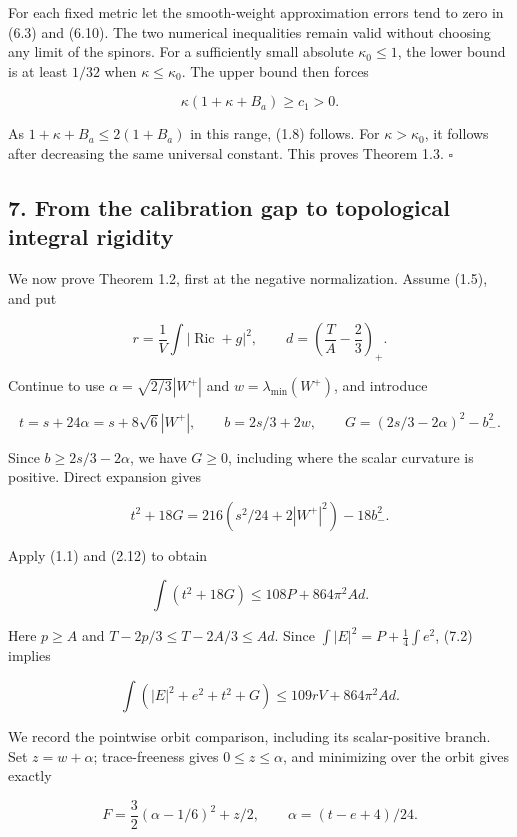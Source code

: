 \documentclass[
  10pt,
]{article}
\begin{document}
For each fixed metric let the smooth-weight approximation errors tend to
zero in (6.3) and (6.10). The two numerical inequalities remain valid
without choosing any limit of the spinors. For a sufficiently small
absolute \(\kappa_0\le1\), the lower bound is at least \(1/32\) when
\(\kappa\le\kappa_0\). The upper bound then forces

\[
                         \kappa(1+\kappa+B_a)\ge c_1>0.
\]

As \(1+\kappa+B_a\le2(1+B_a)\) in this range, (1.8) follows. For
\(\kappa>\kappa_0\), it follows after decreasing the same universal
constant. This proves Theorem 1.3. \(\square\)

\hypertarget{from-the-calibration-gap-to-topological-integral-rigidity}{%
\subsection{7. From the calibration gap to topological integral
rigidity}\label{from-the-calibration-gap-to-topological-integral-rigidity}}

We now prove Theorem 1.2, first at the negative normalization. Assume
(1.5), and put

\[
 r=\frac1V\int|\operatorname{Ric}+g|^2,\qquad
 d=\left(\frac TA-\frac23\right)_+.
\]

Continue to use \(\alpha=\sqrt{2/3}|W^+|\) and
\(w=\lambda_{\min}(W^+)\), and introduce

\[
 t=s+24\alpha=s+8\sqrt6|W^+|,\qquad
 b=2s/3+2w,\qquad
 G=(2s/3-2\alpha)^2-b_-^2.                               \tag{7.1}
\]

Since \(b\ge2s/3-2\alpha\), we have \(G\ge0\), including where the
scalar curvature is positive. Direct expansion gives

\[
 t^2+18G=216\left(s^2/24+2|W^+|^2\right)-18b_-^2.
\]

Apply (1.1) and (2.12) to obtain

\[
                    \int(t^2+18G)\le108P+864\pi^2Ad.
 \tag{7.2}
\]

Here \(p\ge A\) and \(T-2p/3\le T-2A/3\le Ad\). Since
\(\int|E|^2=P+\frac14\int e^2\), (7.2) implies

\[
             \int(|E|^2+e^2+t^2+G)\le109rV+864\pi^2Ad.
 \tag{7.3}
\]

We record the pointwise orbit comparison, including its scalar-positive
branch. Set \(z=w+\alpha\); trace-freeness gives \(0\le z\le\alpha\),
and minimizing over the orbit gives exactly

\[
 F=\frac32(\alpha-1/6)^2+z/2,\qquad
                         \alpha=(t-e+4)/24.              \tag{7.4}
\]
\end{document}
